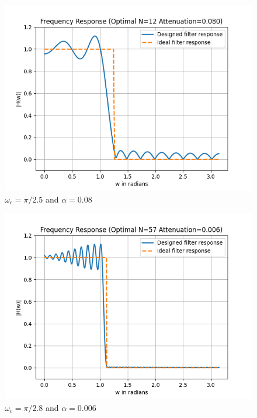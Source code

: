 \documentclass[conference]{IEEEtran}
\begin{document}
\begin{enumerate}[label=(\alph*)]
\begin{figure}[!h]
	\begin{center} 
	    \includegraphics[width=0.7\columnwidth]{figs/C/w1_a2}
	\end{center}
\caption{$\omega_c=\pi/2.5$ and $\alpha = 0.08$}
\label{fig:Fig11}
\end{figure}

\begin{figure}[!h]
	\begin{center} 
	    \includegraphics[width=0.7\columnwidth]{figs/C/w2_a1}
	\end{center}
\caption{$\omega_c=\pi/2.8$ and $\alpha = 0.006$}
\label{fig:Fig12}
\end{figure}


\end{enumerate}
\end{document}
